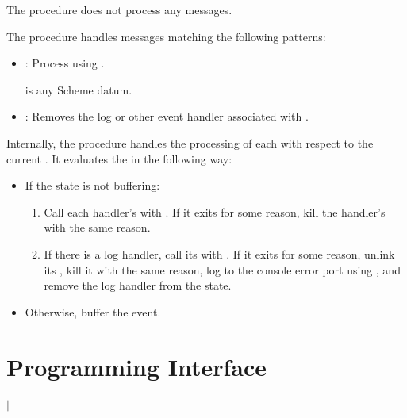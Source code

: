  The  procedure
does not process any messages.

The  procedure
handles messages matching the following patterns:

\antipar\begin{itemize}

\item {}: Process  using
  .

   is any Scheme datum.

\item {}: Removes the log or other
  event handler associated with .

\end{itemize}

Internally, the  procedure
handles the processing of each  with respect to the current
. It evaluates the  in the following way:

\antipar
\begin{itemize}
  \item If the state is not buffering:
    \begin{enumerate}
    \item Call each handler's  with . If it exits
      for some reason, kill the handler's  with the same
      reason.

    \item If there is a log handler, call its  with
      . If it exits for some reason, unlink its
      , kill it with the same reason, log  to
      the console error port using , and
      remove the log handler from the state.
    \end{enumerate}

  \item Otherwise, buffer the event.
\end{itemize}

\section {Programming Interface}

\begin{procedure}
\end{procedure}
\returns{}
 $|$

